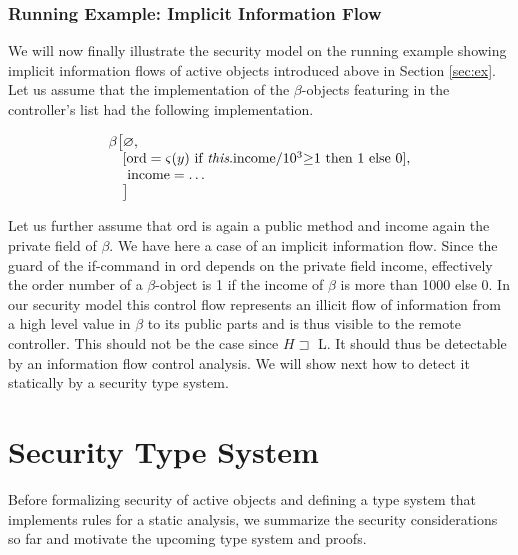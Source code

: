 \documentclass[10pt, conference, compsocconf]{IEEEtran}
\begin{document}
{\subsubsection*{Running Example: Implicit Information Flow}
\label{sec:ifex}
We will now finally illustrate the security model on the running example showing
implicit information flows of active objects introduced above in Section \ref{sec:ex}. 
Let us assume that the implementation of the $\beta$-objects featuring in the controller's list
had the following implementation.

\begin{small}
\[
 \begin{array}{l}
    \beta \big[\varnothing, \\
    \quad [ \text{ord} = \varsigma(y)\ \text{if}\ \text{{\it this}.income}\mathord{/}10^3 \mathord{\ge} 1\  \text{then}\
            1\ \text{else}\ 0 ],\\
    \  \quad \text{income} = \ldots\\
    \quad \big]
 \end{array}
\]
\end{small}

Let us further assume that ord is again a public method and income again the private field of
$\beta$.
We have here a case of an implicit information flow. Since the guard of the if-command in ord 
depends on the private field income, effectively the order number of a $\beta$-object is 1 if the 
income of $\beta$ is more than 1000 else 0. In our security model this control flow represents
an illicit flow of information from a high level value in $\beta$ to its public parts and is thus 
visible to the remote controller. This should not be the case since $H \sqsupset$ L. 
It should thus be detectable by an information flow control analysis. We will show next how to
 detect it statically by a security type system.





\section{Security Type System}
\label{sec:types}
Before formalizing security of active objects and defining a type system that implements
rules for a static analysis, we summarize the security considerations so far and motivate the 
upcoming type system and proofs.
}
\end{document}
